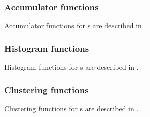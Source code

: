 \subsubsection{Accumulator functions}
Accumulator functions for \Popt{}s are described in . 

\subsubsection{Histogram functions}
Histogram functions for \Popt{}s are described in
. 

\subsubsection{Clustering functions}
Clustering functions for \Popt{}s are described in
. 

